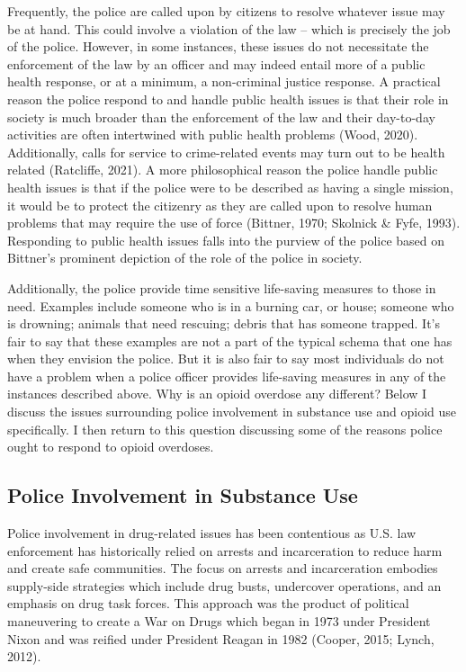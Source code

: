 Frequently, the police are called upon by citizens to resolve whatever issue may be at hand. This could involve a violation of the law – which is precisely the job of the police. However, in some instances, these issues do not necessitate the enforcement of the law by an officer and may indeed entail more of a public health response, or at a minimum, a non-criminal justice response. A practical reason the police respond to and handle public health issues is that their role in society is much broader than the enforcement of the law and their day-to-day activities are often intertwined with public health problems (Wood, 2020). Additionally, calls for service to crime-related events may turn out to be health related (Ratcliffe, 2021). A more philosophical reason the police handle public health issues is that if the police were to be described as having a single mission, it would be to protect the citizenry as they are called upon to resolve human problems that may require the use of force (Bittner, 1970; Skolnick & Fyfe, 1993). Responding to public health issues falls into the purview of the police based on Bittner’s prominent depiction of the role of the police in society.

Additionally, the police provide time sensitive life-saving measures to those in need. Examples include someone who is in a burning car, or house; someone who is drowning; animals that need rescuing; debris that has someone trapped. It's fair to say that these examples are not a part of the typical schema that one has when they envision the police. But it is also fair to say most individuals do not have a problem when a police officer provides life-saving measures in any of the instances described above. Why is an opioid overdose any different? Below I discuss the issues surrounding police involvement in substance use and opioid use specifically. I then return to this question discussing some of the reasons police ought to respond to opioid overdoses. 
 
\subsection{Police Involvement in Substance Use}

Police involvement in drug-related issues has been contentious as U.S. law enforcement has historically relied on arrests and incarceration to reduce harm and create safe communities. The focus on arrests and incarceration embodies supply-side strategies which include drug busts, undercover operations, and an emphasis on drug task forces. This approach was the product of political maneuvering to create a War on Drugs which began in 1973 under President Nixon and was reified under President Reagan in 1982 (Cooper, 2015; Lynch, 2012).

